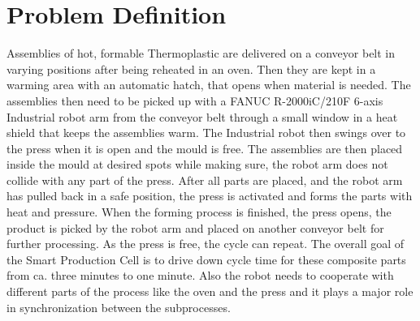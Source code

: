 
\chapter{Problem Definition}

Assemblies of hot, formable Thermoplastic are delivered on a conveyor belt in varying positions after being reheated in an oven. Then they are kept in a warming area with an automatic hatch, that opens when material is needed.
The assemblies then need to be picked up with a FANUC R-2000iC/210F 6-axis Industrial robot arm from the conveyor belt through a small window in a heat shield that keeps the assemblies warm. 
The Industrial robot then swings over to the press when it is open and the mould is free. 
The assemblies are then placed inside the mould at desired spots while making sure, the robot arm does not collide with any part of the press. 
After all parts are placed, and the robot arm has pulled back in a safe position, the press is activated and forms the parts with heat and pressure. 
When the forming process is finished, the press opens, the product is picked by the robot arm and placed on another conveyor belt for further processing. 
As the press is free, the cycle can repeat.
\cite{SystemRequirements}
The overall goal of the Smart Production Cell is to drive down cycle time for these composite parts from ca. three minutes to one minute. 
Also the robot needs to cooperate with different parts of the process like the oven and the press and it plays a major role in synchronization between the subprocesses.
